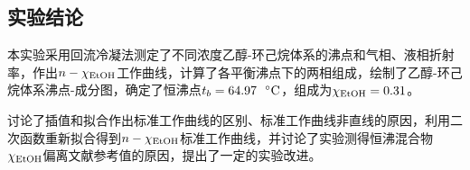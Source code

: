 \documentclass[12pt]{article}
\begin{document}
 	 \subsection{实验结论}
 	 本实验采用回流冷凝法测定了不同浓度乙醇-环己烷体系的沸点和气相、液相折射率，作出$n-\chi_{\ce{EtOH}}$工作曲线，计算了各平衡沸点下的两相组成，绘制了乙醇-环己烷体系沸点-成分图，确定了恒沸点$t_{b}=64.97\ \ {\rm ^{\circ}C}$，组成为$\chi_{\ce{EtOH}}=0.31$。\par 
 	 讨论了插值和拟合作出标准工作曲线的区别、标准工作曲线非直线的原因，利用二次函数重新拟合得到$n-\chi_{\ce{EtOH}}$标准工作曲线，并讨论了实验测得恒沸混合物$\chi_{\ce{EtOH}}$偏离文献参考值的原因，提出了一定的实验改进。



 

   

\vbox{}



\end{document}
